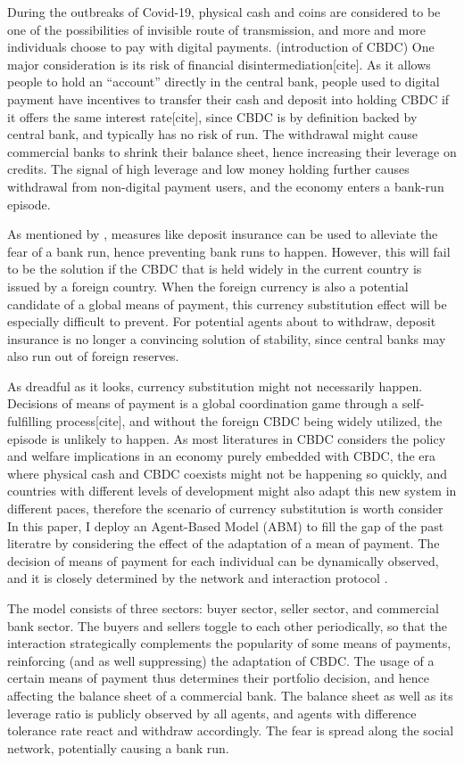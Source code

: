 During the outbreaks of Covid-19, physical cash and coins are considered to be
one of the possibilities of invisible route of transmission, and more and more
individuals choose to pay with digital payments.
(introduction of CBDC)
One major consideration is its risk of financial disintermediation[cite].  As it
allows people to hold an ``account'' directly in the central bank, people used
to digital payment have incentives to transfer their cash and deposit into
holding CBDC if it offers the same interest rate[cite], since CBDC is by
definition backed by central bank, and typically has no risk of run. The
withdrawal might cause commercial banks to shrink their balance sheet, hence
increasing their leverage on credits.  The signal of high leverage and low money
holding further causes withdrawal from non-digital payment users, and the
economy enters a bank-run episode.

As mentioned by \citet*{DD83}, measures like deposit insurance can be used to
alleviate the fear of a bank run, hence preventing bank runs to happen. However,
this will fail to be the solution if the CBDC that is held widely in the current
country is issued by a foreign country. When the foreign currency is also a
potential candidate of a global means of payment, this currency substitution
effect will be especially difficult to prevent.
For potential agents about to withdraw, deposit insurance is no longer a
convincing solution of stability, since central banks may also run out of foreign reserves.

As dreadful as it looks, currency substitution might not necessarily happen.
Decisions of means of payment is a global coordination game through a
self-fulfilling process[cite], and without the foreign CBDC being widely
utilized, the episode is unlikely to happen.
As most literatures in CBDC considers the policy and welfare implications in an
economy purely embedded with CBDC, the era where physical cash and CBDC coexists
might not be happening so quickly, and countries with different levels of
development might also adapt this new system in different paces, therefore the
scenario of currency substitution is worth consider
In this paper, I deploy an Agent-Based Model (ABM) to fill the gap of the past
literatre by considering the effect of the adaptation of a mean of payment. The
decision of means of payment for each individual can be dynamically observed,
and it is closely determined by the network and interaction protocol \citep*{KW98}.

The model consists of three sectors: buyer sector, seller sector, and commercial
bank sector. The buyers and sellers toggle to each other periodically, so that
the interaction strategically complements the popularity of some means of
payments, reinforcing (and as well suppressing) the adaptation of CBDC. The
usage of a certain means of payment thus determines their portfolio decision,
and hence affecting the balance sheet of a commercial bank. The balance sheet as
well as its leverage ratio is publicly observed by all agents, and agents with
difference tolerance rate react and withdraw accordingly. The fear is spread
along the social network, potentially causing a bank run.

